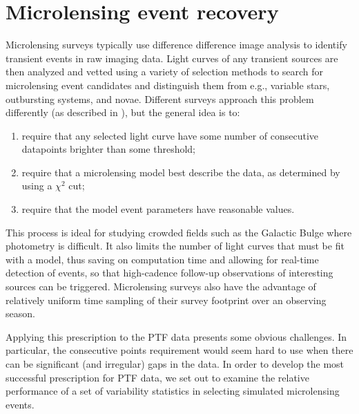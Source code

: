 \documentclass[12pt,preprint]{aastex}
\begin{document}
\section{Microlensing event recovery} \label{sec:event_recovery}
Microlensing surveys typically use difference difference image analysis \citep{alard1998} to identify transient events in raw imaging data. Light curves of any transient sources are then analyzed and vetted using a variety of selection methods to search for microlensing event candidates and distinguish them from e.g., variable stars, outbursting systems, and novae. Different surveys approach this problem differently (as described in \citealt{ogle_optical_depth, con_idx, alcock2000, macho_detection_efficiency, hamadache2009, wyrzykowski2009, sumi2011}), but the general idea is to: 

\begin{enumerate}
	\item require that any selected light curve have some number of consecutive datapoints brighter than some threshold;
	\item require that a microlensing model best describe the data, as determined by using a $\chi^2$ cut;
	\item require that the model event parameters have reasonable values.
\end{enumerate}

This process is ideal for studying crowded fields such as the Galactic Bulge where photometry is difficult. It also limits the number of light curves that must be fit with a model, thus saving on computation time and allowing for real-time detection of events, so that high-cadence follow-up observations of interesting sources can be triggered. Microlensing surveys also have the advantage of relatively uniform time sampling of their survey footprint over an observing season.

Applying this prescription to the PTF data presents some obvious challenges. In particular, the consecutive points requirement would seem hard to use when there can be significant (and irregular) gaps in the data. In order to develop the most successful prescription for PTF data, we set out to examine the relative performance of a set of variability statistics in selecting simulated microlensing events.
\end{document}
